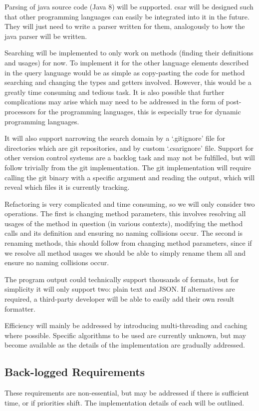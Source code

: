 \documentclass[12pt, letterpaper]{article}
\begin{document}
Parsing of java source code (Java 8) will be supported.
csar will be designed such that other programming languages can easily be integrated into it in the future.
They will just need to write a parser written for them, analogously to how the java parser will be written.

Searching will be implemented to only work on methods (finding their definitions and usages) for now.
To implement it for the other language elements described in the query language would be as simple as copy-pasting the code for method searching and changing the types and getters involved.
However, this would be a greatly time consuming and tedious task.
It is also possible that further complications may arise which may need to be addressed in the form of post-processors for the programming languages, this is especially true for dynamic programming languages.

It will also support narrowing the search domain by a `.gitignore' file for directories which are git repositories, and by custom `.csarignore' file. Support for other version control systems are a backlog task and may not be fulfilled, but will follow trivially from the git implementation.
The git implementation will require calling the git binary with a specific argument and reading the output, which will reveal which files it is currently tracking.

Refactoring is very complicated and time consuming, so we will only consider two operations.
The first is changing method parameters, this involves resolving all usages of the method in question (in various contexts), modifying the method calls and its definition and ensuring no naming collisions occur.
The second is renaming methods, this should follow from changing method parameters, since if we resolve all method usages we should be able to simply rename them all and ensure no naming collisions occur.

The program output could technically support thousands of formats, but for simplicity it will only support two: plain text and JSON.
If alternatives are required, a third-party developer will be able to easily add their own result formatter.

Efficiency will mainly be addressed by introducing multi-threading and caching where possible.
Specific algorithms to be used are currently unknown, but may become available as the details of the implementation are gradually addressed.

\subsection{Back-logged Requirements}
These requirements are non-essential, but may be addressed if there is sufficient time, or if priorities shift.
The implementation details of each will be outlined.
\end{document}
